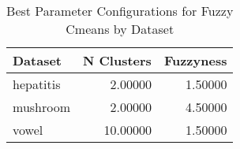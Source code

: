 \begin{table*}[ht!]
\caption{Best Parameter Configurations for Fuzzy Cmeans by Dataset}
\label{tab:best_configs_fuzzy_cmeans_config}
\begin{tabular}{lrr}
Dataset & N Clusters & Fuzzyness \\\midrule

hepatitis & 2.00000 & 1.50000 \\
mushroom & 2.00000 & 4.50000 \\
vowel & 10.00000 & 1.50000 \\
\end{tabular}
\end{table*}
